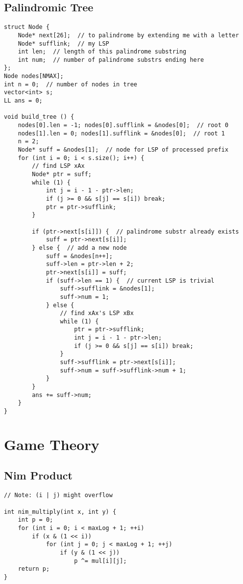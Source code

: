 \documentclass[10pt,landscape]{article}
\begin{document}
\begin{multicols}{2}
\subsection{Palindromic Tree}
\begin{lstlisting}
struct Node {
    Node* next[26];  // to palindrome by extending me with a letter
    Node* sufflink;  // my LSP
    int len;  // length of this palindrome substring
    int num;  // number of palindrome substrs ending here
};
Node nodes[NMAX];
int n = 0;  // number of nodes in tree
vector<int> s;
LL ans = 0;

void build_tree () {
    nodes[0].len = -1; nodes[0].sufflink = &nodes[0];  // root 0
    nodes[1].len = 0; nodes[1].sufflink = &nodes[0];  // root 1
    n = 2;
    Node* suff = &nodes[1];  // node for LSP of processed prefix
    for (int i = 0; i < s.size(); i++) {
        // find LSP xAx
        Node* ptr = suff;
        while (1) {
            int j = i - 1 - ptr->len;
            if (j >= 0 && s[j] == s[i]) break;
            ptr = ptr->sufflink;
        }

        if (ptr->next[s[i]]) {  // palindrome substr already exists
            suff = ptr->next[s[i]];
        } else {  // add a new node
            suff = &nodes[n++];
            suff->len = ptr->len + 2;
            ptr->next[s[i]] = suff;
            if (suff->len == 1) {  // current LSP is trivial
                suff->sufflink = &nodes[1];
                suff->num = 1;
            } else {
                // find xAx's LSP xBx
                while (1) {
                    ptr = ptr->sufflink;
                    int j = i - 1 - ptr->len;
                    if (j >= 0 && s[j] == s[i]) break;
                }
                suff->sufflink = ptr->next[s[i]];
                suff->num = suff->sufflink->num + 1;
            }
        }
        ans += suff->num;
    }
}
\end{lstlisting}
\section{Game Theory}
\subsection{Nim Product}
\begin{lstlisting}
// Note: (i | j) might overflow

int nim_multiply(int x, int y) {
    int p = 0;
    for (int i = 0; i < maxLog + 1; ++i)
        if (x & (1 << i))
            for (int j = 0; j < maxLog + 1; ++j)
                if (y & (1 << j))
                    p ^= mul[i][j];
    return p;
}


\end{lstlisting}
\end{multicols}
\end{document}
